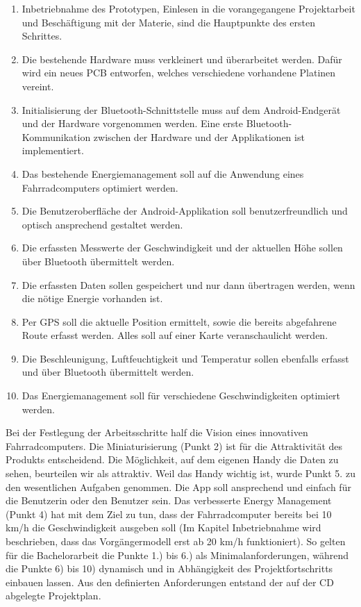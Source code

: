 \begin{enumerate} 

\item Inbetriebnahme des Prototypen, Einlesen in die vorangegangene Projektarbeit und Beschäftigung mit der Materie, sind die Hauptpunkte des ersten Schrittes.
\item Die bestehende Hardware muss verkleinert und überarbeitet werden. Dafür wird ein neues PCB entworfen, welches verschiedene vorhandene Platinen vereint.
\item Initialisierung der Bluetooth-Schnittstelle muss auf dem Android-Endgerät und der Hardware vorgenommen werden. Eine erste Bluetooth-Kommunikation zwischen der Hardware und der Applikationen ist implementiert.
\item Das bestehende Energiemanagement soll auf die Anwendung eines Fahrradcomputers optimiert werden.
\item Die Benutzeroberfläche der Android-Applikation soll benutzerfreundlich und optisch ansprechend gestaltet werden.
\item Die erfassten Messwerte der Geschwindigkeit und der aktuellen Höhe sollen über Bluetooth übermittelt werden.
\item	Die erfassten Daten sollen gespeichert und nur dann übertragen werden, wenn die nötige Energie vorhanden ist.
\item	Per GPS soll die aktuelle Position ermittelt, sowie die bereits abgefahrene Route erfasst werden. Alles soll auf einer Karte veranschaulicht werden.
\item	Die Beschleunigung, Luftfeuchtigkeit und Temperatur sollen ebenfalls erfasst und über Bluetooth übermittelt werden.
\item	Das Energiemanagement soll für verschiedene Geschwindigkeiten optimiert werden.
\end{enumerate}

Bei der Festlegung der Arbeitsschritte half die Vision eines innovativen Fahrradcomputers. Die Miniaturisierung (Punkt 2) ist für die Attraktivität des Produkts entscheidend. Die Möglichkeit, auf dem eigenen Handy die Daten zu sehen, beurteilen wir als attraktiv. Weil das Handy wichtig ist, wurde Punkt 5. zu den wesentlichen Aufgaben genommen. Die App soll ansprechend und einfach für die Benutzerin oder den Benutzer sein. Das verbesserte Energy Management (Punkt 4) hat mit dem Ziel zu tun, dass der Fahrradcomputer bereits bei 10 km/h die Geschwindigkeit ausgeben soll (Im Kapitel Inbetriebnahme wird beschrieben, dass das Vorgängermodell erst ab 20 km/h funktioniert). So gelten für die Bachelorarbeit die Punkte 1.) bis 6.) als Minimalanforderungen, während die Punkte 6) bis 10) dynamisch und in Abhängigkeit des Projektfortschritts einbauen lassen. Aus den definierten Anforderungen entstand der auf der CD abgelegte Projektplan.

